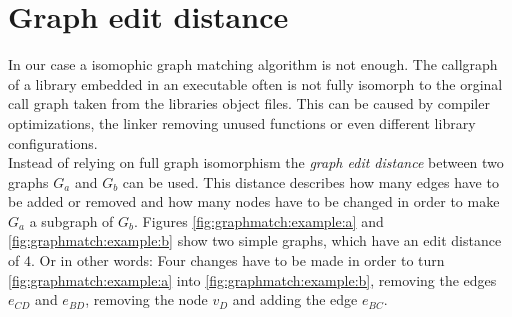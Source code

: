 \documentclass[
    12pt,                               %
    DIV=14,                     %
    parskip=half+,              %
    bigheadings,                %
    cleardoubleempty,   %
    halfparskip,                %
    ]{scrreprt} %
\begin{document}

\section{Graph edit distance} \label{sec:editdistance}
In our case a isomophic graph matching algorithm is not enough. The callgraph of a library embedded in an executable often is not fully isomorph to the orginal call graph taken from the libraries object files. This can be caused by compiler optimizations, the linker removing unused functions or even different library configurations. \\
Instead of relying on full graph isomorphism the \textit{graph edit distance} between two graphs $G_a$ and $G_b$ can be used. This distance describes how many edges have to be added or removed and how many nodes have to be changed in order to make $G_a$ a subgraph of $G_b$. Figures \ref{fig:graphmatch:example:a} and \ref{fig:graphmatch:example:b} show two simple graphs, which have an edit distance of $4$. Or in other words: Four changes have to be made in order to turn \ref{fig:graphmatch:example:a} into \ref{fig:graphmatch:example:b}, removing the edges $e_{CD}$ and $e_{BD}$, removing the node $v_D$ and adding the edge $e_{BC}$. \\

\end{document}

